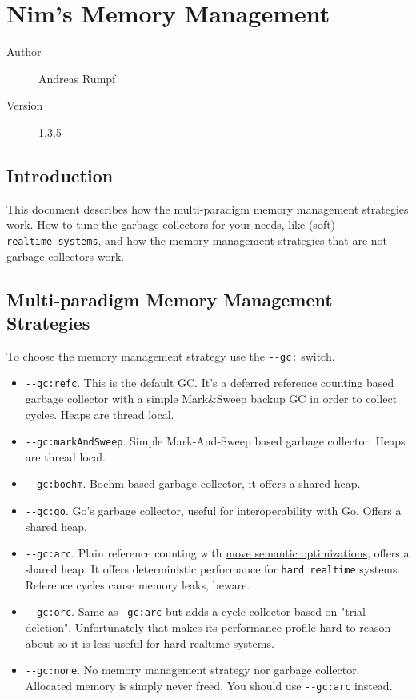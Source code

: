 \hypertarget{nims-memory-management}{%
\section{Nim's Memory Management}\label{nims-memory-management}}

\begin{description}
\item[Author]
Andreas Rumpf
\item[Version]
1.3.5
\end{description}

\hypertarget{introduction}{%
\subsection{Introduction}\label{introduction}}

This document describes how the multi-paradigm memory management
strategies work. How to tune the garbage collectors for your needs, like
(soft) \texttt{realtime\ systems}, and how the memory management
strategies that are not garbage collectors work.

\hypertarget{multi-paradigm-memory-management-strategies}{%
\subsection{Multi-paradigm Memory Management
Strategies}\label{multi-paradigm-memory-management-strategies}}

To choose the memory management strategy use the \texttt{-\/-gc:}
switch.

\begin{itemize}
\tightlist
\item
  \texttt{-\/-gc:refc}. This is the default GC. It's a deferred
  reference counting based garbage collector with a simple Mark\&Sweep
  backup GC in order to collect cycles. Heaps are thread local.
\item
  \texttt{-\/-gc:markAndSweep}. Simple Mark-And-Sweep based garbage
  collector. Heaps are thread local.
\item
  \texttt{-\/-gc:boehm}. Boehm based garbage collector, it offers a
  shared heap.
\item
  \texttt{-\/-gc:go}. Go's garbage collector, useful for
  interoperability with Go. Offers a shared heap.
\item
  \texttt{-\/-gc:arc}. Plain reference counting with
  \href{destructors.html\#move-semantics}{move semantic optimizations},
  offers a shared heap. It offers deterministic performance for
  \texttt{hard\ realtime} systems. Reference cycles cause memory leaks,
  beware.
\item
  \texttt{-\/-gc:orc}. Same as \texttt{-gc:arc} but adds a cycle
  collector based on "trial deletion". Unfortunately that makes its
  performance profile hard to reason about so it is less useful for hard
  realtime systems.
\item
  \texttt{-\/-gc:none}. No memory management strategy nor garbage
  collector. Allocated memory is simply never freed. You should use
  \texttt{-\/-gc:arc} instead.
\end{itemize}

